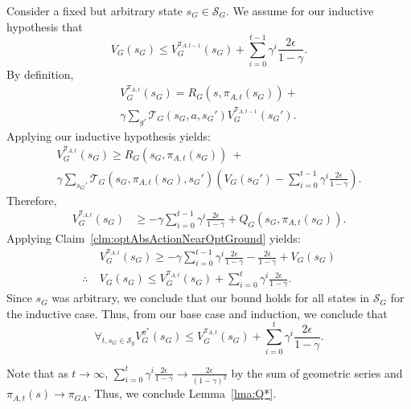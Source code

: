 Consider a fixed but arbitrary state $s_G \in \mathcal{S}_G$.
We assume for our inductive hypothesis that
\begin{equation}
V_G(s_G) \leq V_G^{\pi_{A,t-1}}(s_G) + \sum_{i=0}^{t-1}\gamma^i \frac{2\epsilon}{1-\gamma}.
\end{equation}
By definition,
\begin{multline*}
V_G^{\pi_{A,t}}(s_G) = R_G(s, \pi_{A,t}(s_G)) + \\ \gamma \sum_{g'}\mathcal{T}_G(s_G, a, {s_G}')V_G^{\pi_{A,t-1}}({s_G}').
\end{multline*}
Applying our inductive hypothesis yields:
\begin{multline*}
V_G^{\pi_{A,t}}(s_G) \geq R_G(s_G, \pi_{A,t}(s_G))\ + \\ \gamma \sum_{{s_G}'}\mathcal{T}_G(s_G, \pi_{A,t}(s_G), {s_G}')\left(V_G({s_G}') - \sum_{i=0}^{t-1}\gamma^i \frac{2\epsilon}{1-\gamma} \right).
\end{multline*}
Therefore,
\begin{align*}
V_G^{\pi_{A,t}}(s_G) &\geq -\gamma\sum_{i=0}^{t-1}\gamma^i \frac{2\epsilon}{1-\gamma} + Q_G(s_G, \pi_{A,t} (s_G)).
\end{align*}
Applying Claim~\ref{clm:optAbsActionNearOptGround} yields:
\begin{align*}
&V_G^{\pi_{A,t}}(s_G) \geq -\gamma\sum_{i=0}^{t-1}\gamma^i \frac{2\epsilon}{1-\gamma} - \frac{2\epsilon}{1-\gamma} + V_{G}(s_G) \\
\therefore\ &V_G(s_G) \leq V_G^{\pi_{A,t}}(s_G)  + \sum_{i=0}^{t}\gamma^i \frac{2\epsilon}{1-\gamma}.
\end{align*}
Since $s_G$ was arbitrary, we conclude that our bound holds for all states in $\mathcal{S}_G$ for the inductive case.
Thus, from our base case and induction, we conclude that
\begin{equation}
\forall_{t, s_G \in \mathcal{S}_g} V_G^{\pi^*}(s_G) \leq  V_G^{\pi_{A,t}}(s_G) + \sum_{i=0}^{t}\gamma^i \frac{2\epsilon}{1-\gamma}.
\end{equation}

Note that as $t \rightarrow \infty$, $\sum_{i=0}^{t}\gamma^i \frac{2\epsilon}{1-\gamma} \rightarrow \frac{2\epsilon}{(1-\gamma)^2}$ by the sum of geometric series and $\pi_{A,t}(s) \rightarrow \pi_{GA}$.
Thus, we conclude Lemma~\ref{lma:Q*}.

